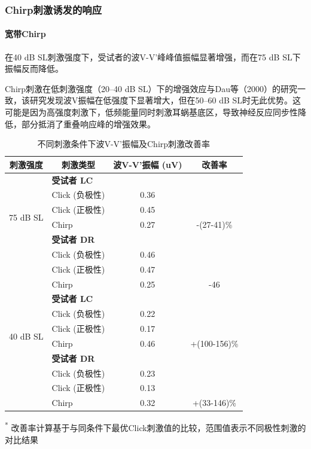 \subsubsection{Chirp刺激诱发的响应}
\paragraph{宽带Chirp}
在40 dB SL刺激强度下，受试者的波V-V'峰峰值振幅显著增强，而在75 dB SL下振幅反而降低。

Chirp刺激在低刺激强度（20–40 dB SL）下的增强效应与Dau等（2000）\cite{dau2000optimized}的研究一致，该研究发现波V振幅在低强度下显著增大，但在50–60 dB SL时无此优势。这可能是因为高强度刺激下，低频能量同时刺激耳蜗基底区，导致神经反应同步性降低，部分抵消了重叠响应峰的增强效果。
\begin{table}[H]
\centering
\caption{不同刺激条件下波V-V'振幅及Chirp刺激改善率}
\label{tab:wave_amplitude}
\begin{tabular}{llcc}
\toprule
\multicolumn{1}{c}{\textbf{刺激强度}} & \multicolumn{1}{c}{\textbf{刺激类型}} & \textbf{波V-V'振幅 (uV)} & \textbf{改善率} \\
\midrule
\multirow{6}{*}{75 dB SL} & \multicolumn{3}{l}{\textbf{受试者 LC}} \\
 & Click (负极性) & 0.36 & \\
 & Click (正极性) & 0.45 & \\
 & Chirp & 0.27 & -(27-41)\% \\
\cmidrule{2-4}
 & \multicolumn{3}{l}{\textbf{受试者 DR}} \\
 & Click (负极性) & 0.46 & \\
 & Click (正极性) & 0.47 & \\
 & Chirp & 0.25 & -46 \\
\midrule
\multirow{6}{*}{40 dB SL} & \multicolumn{3}{l}{\textbf{受试者 LC}} \\
 & Click (负极性) & 0.22 & \\
 & Click (正极性) & 0.17 & \\
 & Chirp & 0.46 & +(100-156)\% \\
\cmidrule{2-4}
 & \multicolumn{3}{l}{\textbf{受试者 DR}} \\
 & Click (负极性) & 0.23 & \\
 & Click (正极性) & 0.13 & \\
 & Chirp & 0.32 & +(33-146)\% \\
\bottomrule
\end{tabular}
\smallskip
\footnotesize
\textsuperscript{*} 改善率计算基于与同条件下最优Click刺激值的比较，范围值表示不同极性刺激的对比结果
\end{table}
\newpage
